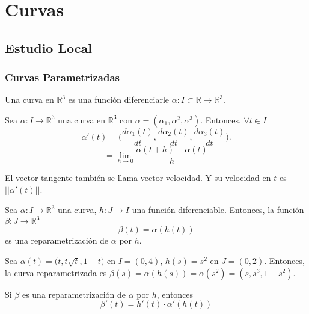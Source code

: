 \part{Curvas}
\chapter{Estudio Local}
\section{Curvas Parametrizadas}

\begin{defn}[Curva]
  Una curva en $\mathbb{R}^{3}$ es una función diferenciarle $\alpha: I \subset \mathbb{R} \to \mathbb{R}^{3}$.
\end{defn}

\begin{defn}
  Sea $\alpha: I \to \mathbb{R}^{3}$ una curva en $\mathbb{R}^{3}$ con $\alpha = (\alpha_{1}, \alpha^{2}, \alpha^{3})$. Entonces, $\forall t \in I$
  \[ 
    \alpha'(t) = \Big ( \frac{d{\alpha_{1}(t)}}{d{t}},\frac{d{\alpha_{2}(t)}}{d{t}},\frac{d{\alpha_{3}(t)}}{d{t}} \Big ).
  \] 
  \[ 
    = \lim_{h \to 0} \frac{\alpha(t+ h) - \alpha(t)}{h} 
  \] 
\end{defn}

\begin{obs}[Velocidad]
  El vector tangente también se llama vector velocidad. Y su velocidad en $t$ es $||\alpha'(t)||$.
\end{obs}

\begin{defn}[Reparametrización]
  Sea $\alpha: I \to \mathbb{R}^{3}$ una curva, $h: J \to I$ una función diferenciable. Entonces, la función $\beta: J \to \mathbb{R}^{3}$
  \[ 
    \beta(t) = \alpha(h(t)) 
  \] 
  es una reparametrización de $\alpha$ por $h$.
\end{defn}

\begin{ejm}
  Sea $\alpha(t) = \big ( t , t \sqrt{t}, 1-t \big )$ en $I = (0,4)$, $h(s) = s^{2}$ en $J = ( 0,2 )$. Entonces, la curva reparametrizada es $\beta(s) = \alpha(h(s)) = \alpha(s^{2}) = ( s, s^{3}, 1 -s^{2} )$.
\end{ejm}

\begin{lem}
  Si $\beta$ es una reparametrización de $\alpha$ por $h$, entonces
  \[ 
    \beta'(t) = h'(t)\cdot \alpha'(h(t)) 
  \] 
\end{lem}

